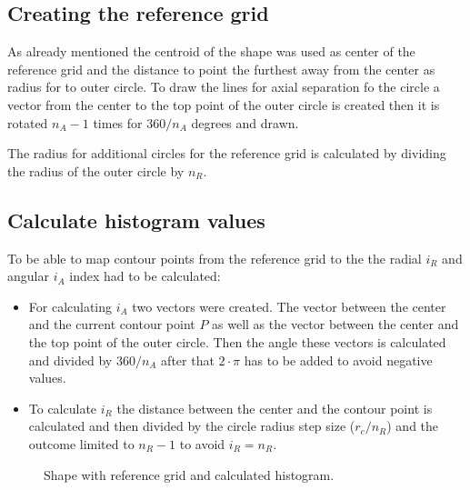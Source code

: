 \subsection{Creating the reference grid}
As already mentioned the centroid of the shape was used as center of the reference grid and the distance to point the furthest away from the center as radius for to outer circle. To draw the lines for axial separation fo the circle a vector from the center to the top point of the outer circle is created then it is rotated $n_A -1$ times for $360/n_A$ degrees and drawn.

The radius for additional circles for the reference grid is calculated by dividing the radius of the outer circle by $n_R$.

\subsection{Calculate histogram values}
To be able to map contour points from the reference grid to the the radial $i_R$ and angular $i_A$ index had to be calculated:
\begin{itemize}
	\item For calculating $i_A$ two vectors were created. The vector between the center and the current contour point $P$ as well as the vector between the center and the top point of the outer circle. Then the angle these vectors is calculated and divided by $360/n_A$ after that $2\cdot \pi$ has to be added to avoid negative values.
	\item To calculate $i_R$ the distance between the center and the contour point is calculated and then divided by the circle radius step size ($r_c/n_R$) and the outcome limited to $n_R -1$ to avoid $i_R = n_R$.
\end{itemize} 

\begin{figure}
	\centering
	\caption{Shape with reference grid and calculated histogram.}
	\label{fig:Result5_1}
\end{figure}

